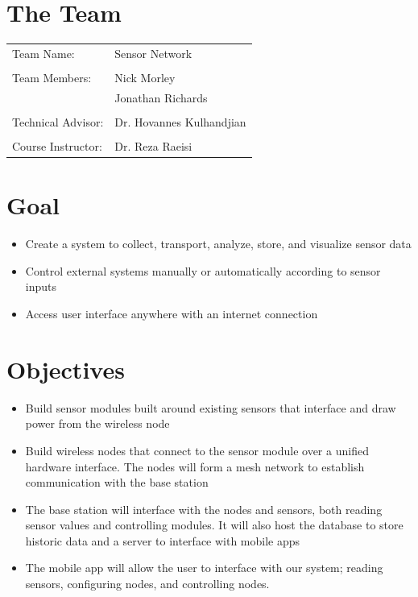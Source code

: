 


  	
	\section{The Team}
		\vfill
		\begin{tabular}{l l}
			Team Name:    & Sensor Network    \\
			\\
			Team Members: & Nick Morley       \\
			              & Jonathan Richards \\
			              \\
			Technical Advisor: & Dr. Hovannes Kulhandjian\\
			\\
			Course Instructor: & Dr. Reza Raeisi\\
		\end{tabular}
		\vfill
		\tableofcontents
		\vfill
		\newpage
		 
	\section{Goal}
		\begin{itemize}
			\item Create a system to collect, transport, analyze, store, and visualize sensor data
			\item Control external systems manually or automatically according to sensor inputs
			\item Access user interface anywhere with an internet connection
		\end{itemize}
		
	\section{Objectives}
		\begin{itemize}
			\item Build sensor modules built around existing sensors that interface and draw power from the wireless node
			\item Build wireless nodes that connect to the sensor module over a unified hardware interface. The nodes will form a mesh network to establish communication with the base station
			\item The base station will interface with the nodes and sensors, both reading sensor values and controlling modules. It will also host the database to store historic data and a server to interface with mobile apps
			\item The mobile app will allow the user to interface with our system; reading sensors, configuring nodes, and controlling nodes.
		\end{itemize}
	
